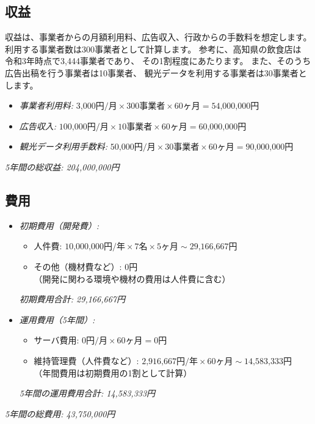 \documentclass{docs}
\begin{document}
\subsection{収益}
収益は、事業者からの月額利用料、広告収入、行政からの手数料を想定します。
利用する事業者数は300事業者として計算します。
参考に、高知県の飲食店は
令和3年時点で3,444事業者であり\cite{keisen_katsudo_2021}、
その1割程度にあたります。
また、そのうち広告出稿を行う事業者は10事業者、
観光データを利用する事業者は30事業者とします。
\begin{itemize}
	\item \emph{事業者利用料:} $\text{3,000円/月}\times\text{300事業者}
	\times\text{60ヶ月}=\text{54,000,000円}$
	\item \emph{広告収入:} $\text{100,000円/月}\times\text{10事業者}
	\times\text{60ヶ月}=\text{60,000,000円}$
	\item \emph{観光データ利用手数料:} $\text{50,000円/月}\times\text{30事業者}
	\times\text{60ヶ月}=\text{90,000,000円}$
\end{itemize}
\emph{5年間の総収益: 204,000,000円}

\subsection{費用}
\begin{itemize}
	\item \emph{初期費用（開発費）:}
		\begin{itemize}
			\item 人件費: $\text{10,000,000円/年}\times\text{7名}\times\text{5ヶ月}
			\sim\text{29,166,667円}$
			\item その他（機材費など）: 0円\\
			（開発に関わる環境や機材の費用は人件費に含む）
		\end{itemize}
		\emph{初期費用合計: 29,166,667円}
	\item \emph{運用費用（5年間）:}
		\begin{itemize}
			\item サーバ費用: $\text{0円/月}\times\text{60ヶ月}
			=\text{0円}$
			\item 維持管理費（人件費など）: $\text{2,916,667円/年}\times\text{60ヶ月}
			\sim\text{14,583,333円}$\\
			（年間費用は初期費用の1割として計算）
		\end{itemize}
		\emph{5年間の運用費用合計: 14,583,333円}
\end{itemize}
\emph{5年間の総費用: 43,750,000円}
\end{document}
